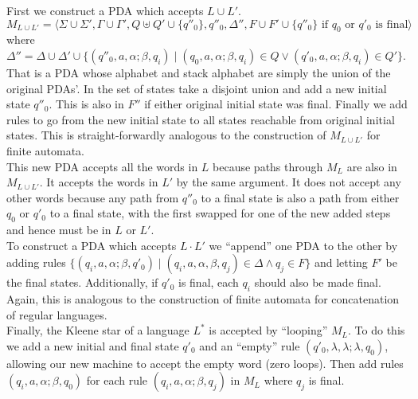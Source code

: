 \documentclass[defaultpackages]{simplereport}
\begin{document}
\begin{itemize}[label=]
     First we construct a PDA which accepts $L \cup L'$. $M_{L \cup L'} =
     \langle \Sigma \cup \Sigma', \Gamma \cup \Gamma', Q \uplus Q' \cup \{q''_0\},
     q''_0, \Delta'', F \cup F' \cup \{q''_0\} \text{ if $q_0$ or $q'_0$ is final}
     \rangle$ where $\Delta'' = \Delta \cup \Delta' \cup \{(q''_0, a, \alpha ;
     \beta, q_i) \mid (q_0, a, \alpha ; \beta, q_i) \in Q \lor (q'_0, a, \alpha
     ; \beta, q_i) \in Q'\}$.
     That is a PDA whose alphabet and stack alphabet are simply the union of the
     original PDAs'. In the set of states take a disjoint union and add a new
     initial state $q''_0$. This is also in $F''$ if either original initial state was final.
     Finally we add rules to go from the new initial state to all states
     reachable from original initial states. This is straight-forwardly analogous to the
     construction of $M_{L \cup L'}$ for finite automata.\\
     This new PDA accepts all the words in $L$ because paths through $M_L$ are
     also in $M_{L \cup L'}$. It accepts the words in $L'$ by the same argument.
     It does not accept any other words because any path from $q''_0$ to a final
     state is also a path from either $q_0$ or $q'_0$ to a final state, with the
     first swapped for one of the new added steps and hence must be in $L$ or
     $L'$.\\

     To construct a PDA which accepts $L \cdot L'$ we ``append'' one PDA
     to the other by adding rules $\{(q_i, a, \alpha ; \beta, q'_0) \mid (q_i,
     a, \alpha, \beta, q_j) \in \Delta \land q_j \in F\}$ and letting $F'$ be
     the final states. Additionally, if $q'_0$ is final, each $q_i$ should also
     be made final. Again, this is analogous to the construction of finite
     automata for concatenation of regular languages.\\

     Finally, the Kleene star of a language $L^*$ is accepted by ``looping''
     $M_L$. To do this we add a new initial and final state $q'_0$ and an ``empty'' rule
     $(q'_0, \lambda, \lambda ; \lambda, q_0)$, allowing our new machine to
     accept the empty word (zero loops). Then add rules $(q_i, a, \alpha; \beta,
     q_0)$ for each rule $(q_i, a, \alpha; \beta, q_j)$ in $M_L$ where $q_j$ is final.
     
\end{itemize}
\end{document}
